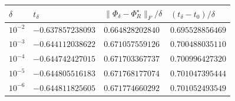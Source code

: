 \begin{center}
\begin{tabular}{@{}llll@{}}
\toprule
\(\delta\) & \(t_\delta\) & \(\|\Phi_\delta-\Phi_R^\star\|_F/\delta\) & \((t_\delta-t_0)/\delta\)\\
\midrule
\(10^{-2}\) & \(-0.637857238093\) & \(0.664828202840\) & \(0.695528856469\)\\
\(10^{-3}\) & \(-0.644112038622\) & \(0.671057559126\) & \(0.700488035110\)\\
\(10^{-4}\) & \(-0.644742427015\) & \(0.671703367737\) & \(0.700996427320\)\\
\(10^{-5}\) & \(-0.644805516183\) & \(0.671768177074\) & \(0.701047395444\)\\
\(10^{-6}\) & \(-0.644811825605\) & \(0.671774660292\) & \(0.701052493549\)\\
\bottomrule
\end{tabular}
\end{center}
